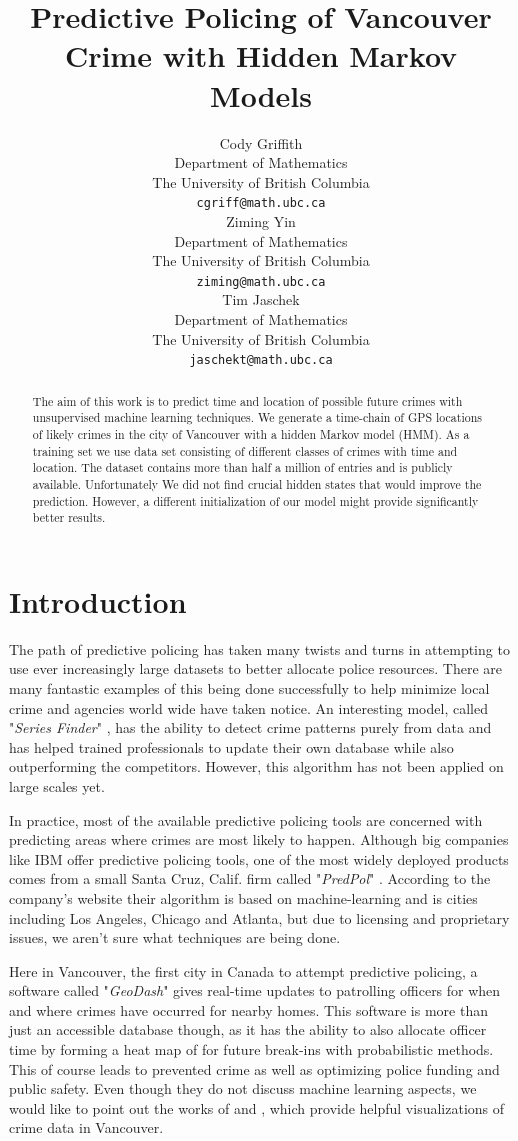 \documentclass{article}
\title{Predictive Policing of Vancouver Crime with Hidden Markov Models}
\author{
Cody Griffith \\
  Department of Mathematics\\
  The University of British Columbia\\
  \texttt{cgriff@math.ubc.ca} \\
 \And
   Ziming Yin \\
  Department of Mathematics\\
  The University of British Columbia\\
  \texttt{ziming@math.ubc.ca} \\
  \And
  Tim Jaschek \\
  Department of Mathematics \\
  The University of British Columbia\\
  \texttt{jaschekt@math.ubc.ca} \\
}
\begin{document}

\maketitle

\begin{abstract}
 The aim of this work is to predict time and location of possible future crimes with unsupervised machine learning techniques. We generate a time-chain of GPS locations of likely crimes in the city of Vancouver with a hidden Markov model (HMM). As a training set we use data set consisting of different classes of crimes with time and location. The dataset contains more than half a million of entries and is publicly available.
Unfortunately We did not find crucial hidden states that would improve the prediction. However, a different initialization of our model might provide significantly better results.
\end{abstract}

\section{Introduction}
\label{sec:into}

\indent The path of predictive policing has taken many twists and turns in attempting to use ever increasingly large datasets to better allocate police resources. There are many fantastic examples of this being done successfully to help minimize local crime and agencies world wide have taken notice. An interesting model, called "\textit{Series Finder}" \cite{wang2013learning}, has the ability to detect crime patterns purely from data and has helped trained professionals to update their own database while also outperforming the competitors. However, this algorithm has not been applied on large scales yet.

In practice, most of the available predictive policing tools are concerned with predicting areas where crimes are most likely to happen. Although big companies like IBM offer predictive policing tools, one of the most widely deployed products comes from a small Santa Cruz, Calif. firm called "\textit{PredPol}" \cite{huff}. According to the company's website their algorithm is based on machine-learning and is cities including Los Angeles, Chicago and Atlanta, but due to licensing and proprietary issues, we aren't sure what techniques are being done.

Here in Vancouver, the first city in Canada to attempt predictive policing, a software called "\textit{GeoDash}" \cite{geo} gives real-time updates to patrolling officers for when and where crimes have occurred for nearby homes. This software is more than just an accessible database though, as it has the ability to also allocate officer time by forming a heat map of for future break-ins with probabilistic methods. This of course leads to prevented crime as well as optimizing police funding and public safety.
Even though they do not discuss machine learning aspects, we would like to point out the works of 
\cite{viz1} and \cite{viz2}, which provide helpful visualizations of crime data in Vancouver.
\end{document}
